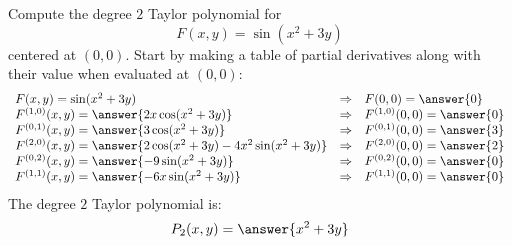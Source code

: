 \documentclass{ximera}
\author{Bart Snapp}
\begin{document}
\begin{exercise}
  Compute the degree $2$ Taylor polynomial for
  \[
  F(x,y) = \sin(x^2+3y)
  \]
  centered at $(0,0)$. Start by making a table of partial
  derivatives along with their value when evaluated at $(0,0)$:
  \[
  \begin{array}{lcl}
    F(x,y) = \sin(x^2+3y) & \Rightarrow &F(0,0) = \answer{0}\\
    F^{(1,0)}(x,y) = \answer{2x\cos(x^2+3y)} & \Rightarrow & F^{(1,0)}(0,0) = \answer{0}\\
    F^{(0,1)}(x,y) = \answer{3\cos(x^2+3y)} &\Rightarrow  & F^{(0,1)}(0,0) = \answer{3}\\
    F^{(2,0)}(x,y) = \answer{2\cos(x^2+3y)-4x^2\sin(x^2+3y)} &\Rightarrow & F^{(2,0)}(0,0) = \answer{2}\\
    F^{(0,2)}(x,y) = \answer{-9\sin(x^2+3y)} &\Rightarrow & F^{(0,2)}(0,0) = \answer{0}\\
    F^{(1,1)}(x,y) = \answer{-6x\sin(x^2+3y)} &\Rightarrow & F^{(1,1)}(0,0) = \answer{0}
    \end{array}
    \]
    The degree $2$ Taylor polynomial is:
    \[
    P_2(x,y) =\answer{x^2+3y}
    \]
\end{exercise}
\end{document}
